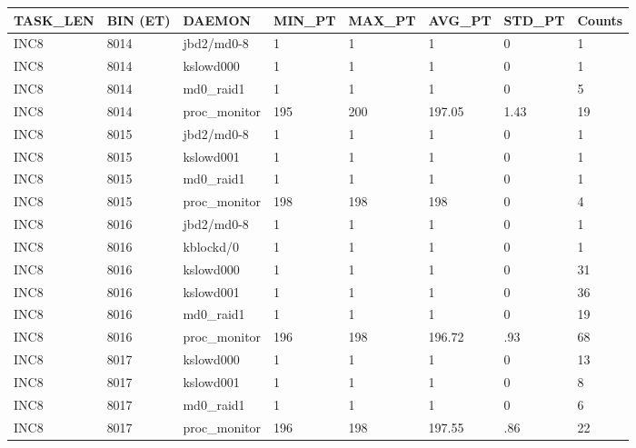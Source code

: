\begin{table}[h]
\begin{center}
{\scriptsize
\begin{tabular}{l|l|l|l|l|l|l|l} \hline
TASK\_LEN  & BIN (ET) &  DAEMON   & MIN\_PT  &  MAX\_PT  &  AVG\_PT  &   STD\_PT & Counts \\ \hline
INC8     & 8014     & jbd2/md0-8     & 1     & 1     & 1     & 0     & 1\\ \hline
INC8     & 8014     & kslowd000     & 1     & 1     & 1     & 0     & 1\\ \hline
INC8     & 8014     & md0\_raid1     & 1     & 1     & 1     & 0     & 5\\ \hline
INC8     & 8014     & proc\_monitor     & 195     & 200     & 197.05     & 1.43     & 19\\ \hline \hline

INC8     & 8015     & jbd2/md0-8     & 1     & 1     & 1     & 0     & 1\\ \hline
INC8     & 8015     & kslowd001     & 1     & 1     & 1     & 0     & 1\\ \hline
INC8     & 8015     & md0\_raid1     & 1     & 1     & 1     & 0     & 1\\ \hline
INC8     & 8015     & proc\_monitor     & 198     & 198     & 198     & 0     & 4\\ \hline \hline

INC8     & 8016     & jbd2/md0-8     & 1     & 1     & 1     & 0     & 1\\ \hline
INC8     & 8016     & kblockd/0     & 1     & 1     & 1     & 0     & 1\\ \hline
INC8     & 8016     & kslowd000     & 1     & 1     & 1     & 0     & 31\\ \hline
INC8     & 8016     & kslowd001     & 1     & 1     & 1     & 0     & 36\\ \hline
INC8     & 8016     & md0\_raid1     & 1     & 1     & 1     & 0     & 19\\ \hline
INC8     & 8016     & proc\_monitor     & 196     & 198     & 196.72     & .93     & 68\\ \hline \hline

INC8     & 8017     & kslowd000     & 1     & 1     & 1     & 0     & 13\\ \hline
INC8     & 8017     & kslowd001     & 1     & 1     & 1     & 0     & 8\\ \hline
INC8     & 8017     & md0\_raid1     & 1     & 1     & 1     & 0     & 6\\ \hline
INC8     & 8017     & proc\_monitor     & 196     & 198     & 197.55     & .86     & 22\\ \hline \hline


\end{tabular}}
\end{center}
\end{table}
